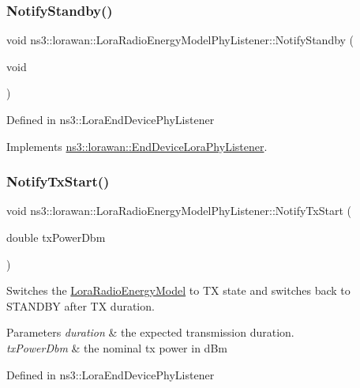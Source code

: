 \subsubsection{\texorpdfstring{Notify\+Standby()}{NotifyStandby()}}
{\footnotesize\ttfamily void ns3\+::lorawan\+::\+Lora\+Radio\+Energy\+Model\+Phy\+Listener\+::\+Notify\+Standby (\begin{DoxyParamCaption}\item[{void}]{ }\end{DoxyParamCaption})\hspace{0.3cm}{\ttfamily [virtual]}}

Defined in ns3\+::\+Lora\+End\+Device\+Phy\+Listener 

Implements \hyperlink{classns3_1_1lorawan_1_1EndDeviceLoraPhyListener_ab7e6540205cc6a0cefbe226bda967187}{ns3\+::lorawan\+::\+End\+Device\+Lora\+Phy\+Listener}.

\mbox{\label{classns3_1_1lorawan_1_1LoraRadioEnergyModelPhyListener_a42d031fca675ad2a5b76977a7d79e900}} 
\subsubsection{\texorpdfstring{Notify\+Tx\+Start()}{NotifyTxStart()}}
{\footnotesize\ttfamily void ns3\+::lorawan\+::\+Lora\+Radio\+Energy\+Model\+Phy\+Listener\+::\+Notify\+Tx\+Start (\begin{DoxyParamCaption}\item[{double}]{tx\+Power\+Dbm }\end{DoxyParamCaption})\hspace{0.3cm}{\ttfamily [virtual]}}



Switches the \hyperlink{classns3_1_1lorawan_1_1LoraRadioEnergyModel}{Lora\+Radio\+Energy\+Model} to TX state and switches back to S\+T\+A\+N\+D\+BY after TX duration. 


\begin{DoxyParams}{Parameters}
{\em duration} & the expected transmission duration. \\
\hline
{\em tx\+Power\+Dbm} & the nominal tx power in d\+Bm\\
\hline
\end{DoxyParams}
Defined in ns3\+::\+Lora\+End\+Device\+Phy\+Listener 

